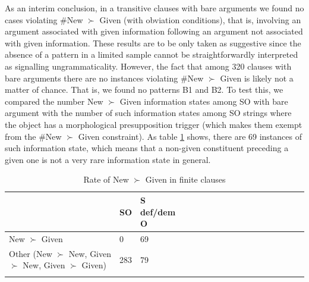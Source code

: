 \documentclass[output=paper,modfonts,nonflat]{langsci/langscibook}
\begin{document}
As an interim conclusion, in a transitive clauses with bare arguments we found no cases violating \#New $\succ$ Given (with obviation conditions), that is, involving an argument associated with given information following an argument not associated with given information. These results are to be only taken as suggestive since the absence of a pattern in a limited sample cannot be straightforwardly interpreted as signalling ungrammaticality. However, the fact that among 320 clauses with bare arguments there are no instances violating \#New $\succ$ Given is likely not a matter of chance. That is, we found no patterns B1 and B2. To test this, we compared the number New $\succ$ Given information states among SO with bare argument  with the number of such information states among SO strings where the object has a morphological presupposition trigger (which makes them exempt from the \#New $\succ$ Given constraint). As table \ref{table:orders} shows, there are 69 instances of such information state, which means that a non-given constituent preceding a given one is not a very rare information state in general.




 \begin{table}
\centering
\begin{tabular}{lllllllllllllllll}
  \lsptoprule
 & SO & S def/dem O \\ 
 \midrule
New $\succ$ Given	&	0	& 69	\\
Other ({\scriptsize New $\succ$ New, Given $\succ$ New, Given $\succ$ Given}) 		&	283	&	79	\\
   \lspbottomrule
\end{tabular}
\caption{Rate of New $\succ$ Given in finite clauses}\label{table:orders}
\end{table}
\end{document}
